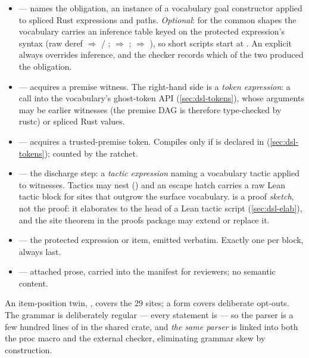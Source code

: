 \begin{itemize}[leftmargin=1.4em]
\item {} --- names the obligation, an
  instance of a vocabulary goal constructor applied to spliced Rust
  expressions and paths. \emph{Optional}: for the common shapes the
  vocabulary carries an inference table keyed on the protected
  expression's syntax (raw deref $\Rightarrow$  /
  ;  $\Rightarrow$
  ;  $\Rightarrow$
  ), so short scripts start at . An
  explicit  always overrides inference, and the checker
  records which of the two produced the obligation.
\item {} --- acquires a premise witness. The
  right-hand side is a \emph{token expression}: a call into the
  vocabulary's ghost-token API (\cref{sec:dsl-tokens}), whose
  arguments may be earlier witnesses (the premise DAG is therefore
  type-checked by rustc) or spliced Rust values.
\item {} --- acquires a
  trusted-premise token. Compiles only if  is declared in
   (\cref{sec:dsl-tokens}); counted by the ratchet.
\item {} --- the discharge step: a
  \emph{tactic expression} naming a vocabulary tactic applied to
  witnesses. Tactics may nest () and
  an escape hatch  carries a raw Lean tactic
  block for sites that outgrow the surface vocabulary.  is
  a proof \emph{sketch}, not the proof: it elaborates to the head of a
  Lean tactic script (\cref{sec:dsl-elab}), and the site theorem in
  the proofs package may extend or replace it.
\item {} --- the protected expression or item, emitted
  verbatim. Exactly one per block, always last.
\item {} --- attached prose, carried into the manifest
  for reviewers; no semantic content.
\end{itemize}

An item-position twin, , covers the 29  sites; a
 form covers deliberate opt-outs.
The grammar is deliberately regular --- every statement is
 --- so the parser is a few hundred lines of
 in the shared  crate, and \emph{the same
parser} is linked into both the proc macro and the external checker,
eliminating grammar skew by construction.

